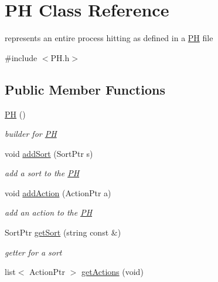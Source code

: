 \hypertarget{class_p_h}{\section{\-P\-H \-Class \-Reference}
\label{class_p_h}
}


represents an entire process hitting as defined in a \hyperlink{class_p_h}{\-P\-H} file  




{\ttfamily \#include $<$\-P\-H.\-h$>$}

\subsection*{\-Public \-Member \-Functions}
\begin{DoxyCompactItemize}
\item 
\hypertarget{class_p_h_ae3ab2dd87b4bfadf04c1a14c6091aebc}{\hyperlink{class_p_h_ae3ab2dd87b4bfadf04c1a14c6091aebc}{\-P\-H} ()}\label{class_p_h_ae3ab2dd87b4bfadf04c1a14c6091aebc}

\begin{DoxyCompactList}\small\item\em builder for \hyperlink{class_p_h}{\-P\-H} \end{DoxyCompactList}\item 
void \hyperlink{class_p_h_ad4335e01899c57e6802021f1afb83e7f}{add\-Sort} (\-Sort\-Ptr s)
\begin{DoxyCompactList}\small\item\em add a sort to the \hyperlink{class_p_h}{\-P\-H} \end{DoxyCompactList}\item 
void \hyperlink{class_p_h_ae9bed9356d272f3c43f2147d6d8e5906}{add\-Action} (\-Action\-Ptr a)
\begin{DoxyCompactList}\small\item\em add an action to the \hyperlink{class_p_h}{\-P\-H} \end{DoxyCompactList}\item 
\hypertarget{class_p_h_a02f1cd90c270555a50c08caa0fb2d491}{\-Sort\-Ptr \hyperlink{class_p_h_a02f1cd90c270555a50c08caa0fb2d491}{get\-Sort} (string const \&)}\label{class_p_h_a02f1cd90c270555a50c08caa0fb2d491}

\begin{DoxyCompactList}\small\item\em getter for a sort \end{DoxyCompactList}\item 
\hypertarget{class_p_h_ae9861660fe017ab285451b2ac8e191a4}{list$<$ \-Action\-Ptr $>$ \hyperlink{class_p_h_ae9861660fe017ab285451b2ac8e191a4}{get\-Actions} (void)}\label{class_p_h_ae9861660fe017ab285451b2ac8e191a4}


\end{DoxyCompactItemize}
